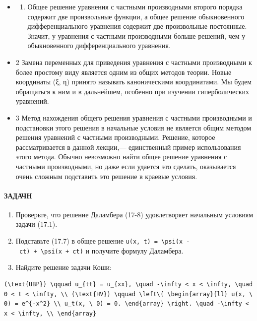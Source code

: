 \documentclass[
  ukrainian,
]{article}
\providecommand{\tightlist}{%
  \setlength{\itemsep}{0pt}\setlength{\parskip}{0pt}}
\begin{document}
\begin{itemize}
\tightlist
\item
  \begin{enumerate}
  \def\labelenumi{\arabic{enumi}.}
  \tightlist
  \item
    Общее решение уравнения с частными производными второго порядка
    содержит две произвольные функции, а общее решение обыкновенного
    дифференциального уравнения содержит две произвольные постоянные.
    Значит, у уравнения с частными производными больше решений, чем у
    обыкновенного дифференциального уравнения.
  \end{enumerate}
\item
  2 Замена переменных для приведения уравнения с частными производными к
  более простому виду является одним из общих методов теории. Новые
  координаты (ξ, η) принято называть каноническими координатами. Мы
  будем обращаться к ним и в дальнейшем, особенно при изучении
  гиперболических уравнений.
\item
  3 Метод нахождения общего решения уравнения с частными производными и
  подстановки этого решения в начальные условия не является общим
  методом решения уравнений с частными производными. Решение, которое
  рассматривается в данной лекции,--- единственный пример использования
  этого метода. Обычно невозможно найти общее решение уравнения с
  частными производными, но даже если удается это сделать, оказывается
  очень сложным подставить это решение в краевые условия.
\end{itemize}

\paragraph{ЗАДАЧН}\label{ux437ux430ux434ux430ux447ux43d}

\begin{enumerate}
\def\labelenumi{\arabic{enumi}.}
\item
  Проверьте, что решение Даламбера (17-8) удовлетворяет начальным
  условиям задачи (17.1).
\item
  Подставьте (17.7) в общее решение
  \texttt{u(x,\ t)\ =\ \textbackslash{}psi(x\ -\ ct)\ +\ \textbackslash{}psi(x\ +\ ct)}
  и получите формулу Даламбера.
\item
  Найдите решение задачи Коши:
\end{enumerate}

\begin{verbatim}
(\text{UBP}) \qquad u_{tt} = u_{xx}, \quad -\infty < x < \infty, \quad 0 < t < \infty, \\ (\text{HV}) \qquad \left\{ \begin{array}{ll} u(x, \ 0) = e^{-x^2} \\ u_t(x, \ 0) = 0. \end{array} \right. \quad -\infty < x < \infty, \\ \end{array}
\end{verbatim}
\end{document}
